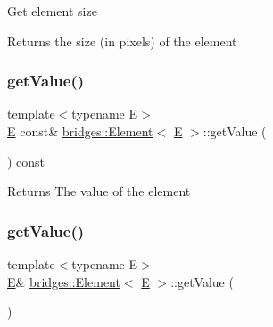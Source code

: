 Get element size \begin{DoxyReturn}{Returns}
the size (in pixels) of the element 
\end{DoxyReturn}
\mbox{\label{classbridges_1_1_element_a9d32bb23420c0ec61684c79964fa14b0}} 
\subsubsection{\texorpdfstring{getValue()}{getValue()}\hspace{0.1cm}{\footnotesize\ttfamily [1/2]}}
{\footnotesize\ttfamily template$<$typename E$>$ \\
\mbox{\hyperlink{namespacebridges_acfb0a4f7877d8f63de3e6862004c50eda3a3ea00cfc35332cedf6e5e9a32e94da}{E}} const\& \mbox{\hyperlink{classbridges_1_1_element}{bridges\+::\+Element}}$<$ \mbox{\hyperlink{namespacebridges_acfb0a4f7877d8f63de3e6862004c50eda3a3ea00cfc35332cedf6e5e9a32e94da}{E}} $>$\+::get\+Value (\begin{DoxyParamCaption}{ }\end{DoxyParamCaption}) const\hspace{0.3cm}{\ttfamily [inline]}}

\begin{DoxyReturn}{Returns}
The value of the element 
\end{DoxyReturn}
\mbox{\label{classbridges_1_1_element_aef73562aef54dd132d779104800e5ed5}} 
\subsubsection{\texorpdfstring{getValue()}{getValue()}\hspace{0.1cm}{\footnotesize\ttfamily [2/2]}}
{\footnotesize\ttfamily template$<$typename E$>$ \\
\mbox{\hyperlink{namespacebridges_acfb0a4f7877d8f63de3e6862004c50eda3a3ea00cfc35332cedf6e5e9a32e94da}{E}}\& \mbox{\hyperlink{classbridges_1_1_element}{bridges\+::\+Element}}$<$ \mbox{\hyperlink{namespacebridges_acfb0a4f7877d8f63de3e6862004c50eda3a3ea00cfc35332cedf6e5e9a32e94da}{E}} $>$\+::get\+Value (\begin{DoxyParamCaption}{ }\end{DoxyParamCaption})\hspace{0.3cm}{\ttfamily [inline]}}

